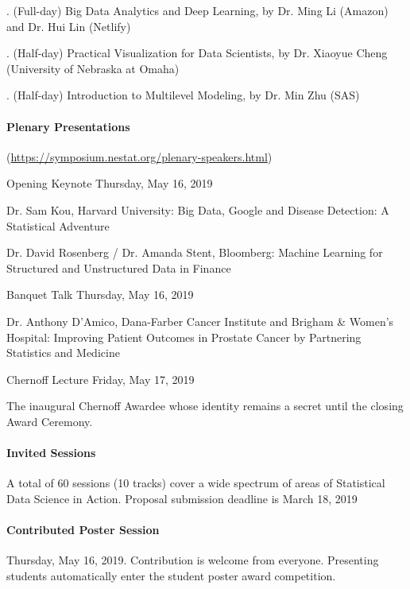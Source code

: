 \documentclass[12pt]{article}
\begin{document}
. (Full-day) Big Data Analytics and Deep Learning, by Dr. Ming Li (Amazon) and Dr. Hui Lin (Netlify)

. (Half-day) Practical Visualization for Data Scientists, by Dr. Xiaoyue Cheng (University of Nebraska at Omaha)

. (Half-day) Introduction to Multilevel Modeling, by Dr. Min Zhu (SAS)

\paragraph{Plenary Presentations} (\url{https://symposium.nestat.org/plenary-speakers.html})

\noindent\textsf{Opening Keynote} Thursday, May 16, 2019

Dr. Sam Kou, Harvard University: Big Data, Google and Disease Detection: A Statistical Adventure

Dr. David Rosenberg / Dr. Amanda Stent, Bloomberg: Machine Learning for Structured and Unstructured Data in Finance

\noindent\textsf{Banquet Talk} Thursday, May 16, 2019

Dr. Anthony D'Amico,   Dana-Farber Cancer Institute and Brigham \& Women's Hospital: Improving Patient Outcomes in Prostate Cancer by Partnering Statistics and Medicine

\noindent\textsf{Chernoff Lecture} Friday, May 17, 2019

The inaugural Chernoff Awardee whose identity remains a secret until the closing Award Ceremony.

\paragraph{Invited Sessions}
A total of 60 sessions (10 tracks) cover a wide spectrum of areas of Statistical Data Science in Action. %
Proposal submission deadline is March 18, 2019

\paragraph{Contributed Poster Session} Thursday, May 16, 2019.
Contribution is welcome from everyone.
Presenting students automatically enter the student poster award competition.
\end{document}
